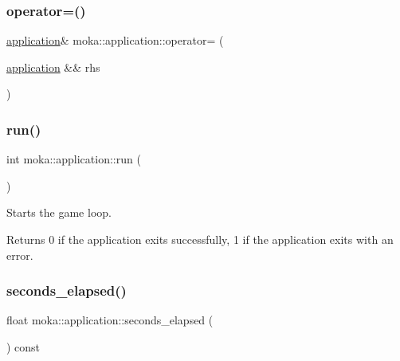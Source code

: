 \mbox{\label{classmoka_1_1application_a9398b1692b1c703e93ab4d5872744ab1}} 
\subsubsection{\texorpdfstring{operator=()}{operator=()}\hspace{0.1cm}{\footnotesize\ttfamily [2/2]}}
{\footnotesize\ttfamily \mbox{\hyperlink{classmoka_1_1application}{application}}\& moka\+::application\+::operator= (\begin{DoxyParamCaption}\item[{\mbox{\hyperlink{classmoka_1_1application}{application}} \&\&}]{rhs }\end{DoxyParamCaption})\hspace{0.3cm}{\ttfamily [delete]}}

\mbox{\label{classmoka_1_1application_a14965b715fe146c3253a7fbdf53a9a98}} 
\subsubsection{\texorpdfstring{run()}{run()}}
{\footnotesize\ttfamily int moka\+::application\+::run (\begin{DoxyParamCaption}{ }\end{DoxyParamCaption})}



Starts the game loop. 

\begin{DoxyReturn}{Returns}
0 if the application exits successfully, 1 if the application exits with an error. 
\end{DoxyReturn}
\mbox{\label{classmoka_1_1application_a3db4349bae1c5c42e1107327641d1368}} 
\subsubsection{\texorpdfstring{seconds\_elapsed()}{seconds\_elapsed()}}
{\footnotesize\ttfamily float moka\+::application\+::seconds\+\_\+elapsed (\begin{DoxyParamCaption}{ }\end{DoxyParamCaption}) const}



